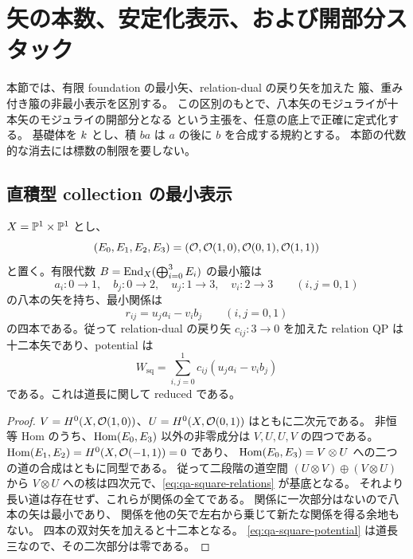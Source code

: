 \section{矢の本数、安定化表示、および開部分スタック}
\label{sec:qa-presentations}

本節では、有限 foundation の最小矢、relation-dual の戻り矢を加えた
箙、重み付き箙の非最小表示を区別する。
この区別のもとで、八本矢のモジュライが十本矢のモジュライの開部分となる
という主張を、任意の底上で正確に定式化する。
基礎体を $k$ とし、積 $ba$ は $a$ の後に $b$ を合成する規約とする。
本節の代数的な消去には標数の制限を要しない。

\subsection{直積型 collection の最小表示}

\begin{proposition}
\label{prop:qa-product-count}
$X=\mathbb P^1\times\mathbb P^1$ とし、
\[
 (E_0,E_1,E_2,E_3)
   =(\mathcal O,\mathcal O(1,0),\mathcal O(0,1),\mathcal O(1,1))
\]
と置く。有限代数 $B=\operatorname{End}_X(\bigoplus_{i=0}^3E_i)$ の最小箙は
\[
 a_i:0\longrightarrow1,\quad b_j:0\longrightarrow2,\quad
 u_j:1\longrightarrow3,\quad v_i:2\longrightarrow3
 \qquad(i,j=0,1)
\]
の八本の矢を持ち、最小関係は
\begin{equation}
\label{eq:qa-square-relations}
 r_{ij}=u_ja_i-v_ib_j\qquad(i,j=0,1)
\end{equation}
の四本である。従って relation-dual の戻り矢
$c_{ij}:3\to0$ を加えた relation QP は十二本矢であり、potential は
\begin{equation}
\label{eq:qa-square-potential}
 W_{\mathrm{sq}}=\sum_{i,j=0}^1c_{ij}(u_ja_i-v_ib_j)
\end{equation}
である。これは道長に関して reduced である。
\end{proposition}

\begin{proof}
$V=H^0(X,\mathcal O(1,0))$、$U=H^0(X,\mathcal O(0,1))$ はともに二次元である。
非恒等 Hom のうち、$\operatorname{Hom}(E_0,E_3)$ 以外の非零成分は
$V,U,U,V$ の四つである。
$\operatorname{Hom}(E_1,E_2)=H^0(X,\mathcal O(-1,1))=0$ であり、
$\operatorname{Hom}(E_0,E_3)=V\otimes U$ への二つの道の合成はともに同型である。
従って二段階の道空間 $(U\otimes V)\oplus(V\otimes U)$ から
$V\otimes U$ への核は四次元で、\eqref{eq:qa-square-relations} が基底となる。
それより長い道は存在せず、これらが関係の全てである。
関係に一次部分はないので八本の矢は最小であり、
関係を他の矢で左右から乗じて新たな関係を得る余地もない。
四本の双対矢を加えると十二本となる。
\eqref{eq:qa-square-potential} は道長三なので、その二次部分は零である。
\end{proof}

